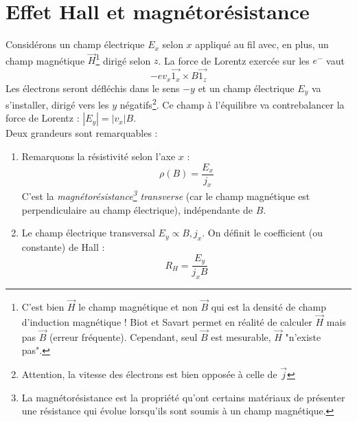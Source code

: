 \section{Effet Hall et magnétorésistance}
Considérons un champ électrique $E_x$ selon $x$ appliqué au fil avec, en plus, un 
champ magnétique $\vec{H}$\footnote{C'est bien $\vec{H}$ le champ magnétique et non 
	$\vec B$ qui est la densité de champ d'induction magnétique ! Biot et Savart permet 
	en réalité de calculer $\vec{H}$ mais pas $\vec{B}$ (erreur fréquente). Cependant, 
	seul $\vec{B}$ est mesurable, $\vec{H}$ "n'existe pas".} dirigé selon $z$. La force 
de Lorentz exercée sur les $e^-$ vaut 
\begin{equation}
	-ev_x\vec{1_x}\times B\vec{1_z}
\end{equation}
Les électrons seront défléchis dans le sens $-y$ et un champ électrique $E_y$ va 
s'installer, dirigé vers les $y$ négatifs\footnote{Attention, la vitesse des 
	électrons est bien opposée à celle de $\vec{j}$}. Ce champ à l'équilibre va 
contrebalancer la force de Lorentz : $|E_y| = |v_x|B$.\\

Deux grandeurs sont remarquables :
\begin{enumerate}
	\item Remarquons la résistivité selon l'axe $x$ :
	      \begin{equation}
	      	\rho(B) = \dfrac{E_x}{j_x}
	      \end{equation}
	      C'est la \textit{magnétorésistance\footnote{La magnétorésistance est la propriété 
	      	qu'ont certains matériaux de présenter une résistance qui évolue lorsqu'ils sont 
	      soumis à un champ magnétique.} transverse} (car le champ magnétique est 
	      perpendiculaire au champ électrique), indépendante de $B$.
	      
	\item Le champ électrique transversal $E_y \propto B, j_x$. On définit le 
	      coefficient (ou constante) de Hall :
	      \begin{equation}
	      	R_H = \dfrac{E_y}{j_xB}
	      \end{equation}
\end{enumerate}

